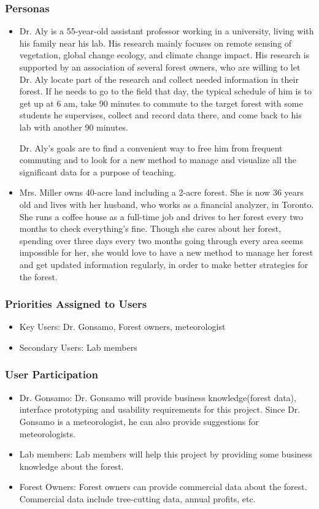 \documentclass{article}
\begin{document}
\subsubsection{Personas}
\begin{itemize}
    \item Dr. Aly is a 55-year-old assistant professor working in a university, living with his family near his lab. His research mainly focuses on remote sensing of vegetation, global change ecology, and climate change impact. His research is supported by an association of several forest owners, who are willing to let Dr. Aly locate part of the research and collect needed information in their forest. If he needs to go to the field that day, the typical schedule of him is to get up at 6 am, take 90 minutes to commute to the target forest with some students he supervises, collect and record data there, and come back to his lab with another 90 minutes. 
    
    Dr. Aly's goals are to find a convenient way to free him from frequent commuting and to look for a new method to manage and visualize all the significant data for a purpose of teaching. 
    
    \item Mrs. Miller owns 40-acre land including a 2-acre forest. She is now 36 years old and lives with her husband, who works as a financial analyzer, in Toronto. She runs a coffee house as a full-time job and drives to her forest every two months to check everything's fine. Though she cares about her forest, spending over three days every two months going through every area seems impossible for her, she would love to have a new method to manage her forest and get updated information regularly, in order to make better strategies for the forest. 
\end{itemize}

\subsubsection{Priorities Assigned to Users}
\begin{itemize}
    \item Key Users: Dr. Gonsamo, Forest owners, meteorologist
    \item Secondary Users: Lab members
\end{itemize}

\subsubsection{User Participation}
\begin{itemize}
    \item Dr. Gonsamo: Dr. Gonsamo will provide business knowledge(forest data), 
    interface prototyping and usability requirements for this project. Since Dr. Gonsamo is 
    a meteorologist, he can also provide suggestions for meteorologists.
    \item Lab members: Lab members will help this project by providing some business knowledge
    about the forest.
    \item Forest Owners: Forest owners can provide commercial data about the forest. Commercial
    data include tree-cutting data, annual profits, etc.
\end{itemize}
\end{document}
